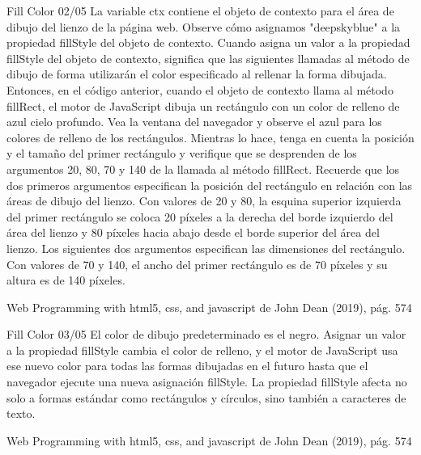 \begin{frame}{Fill Color 02/05}
\justifying
La variable ctx contiene el objeto de contexto para el área de dibujo del lienzo de la página web. Observe cómo asignamos "deepskyblue" a la propiedad fillStyle del objeto de contexto. Cuando asigna un valor a la propiedad fillStyle del objeto de contexto, significa que las siguientes llamadas al método de dibujo de forma utilizarán el color especificado al rellenar la forma dibujada. Entonces, en el código anterior, cuando el objeto de contexto llama al método fillRect, el motor de JavaScript dibuja un rectángulo con un color de relleno de azul cielo profundo. Vea la ventana del navegador y observe el azul para los colores de relleno de los rectángulos.
Mientras lo hace, tenga en cuenta la posición y el tamaño del primer rectángulo y verifique que se desprenden de los argumentos 20, 80, 70 y 140 de la llamada al método fillRect. Recuerde que los dos primeros argumentos especifican la posición del rectángulo en relación con las áreas de dibujo del lienzo. Con valores de 20 y 80, la esquina superior izquierda del primer rectángulo se coloca 20 píxeles a la derecha del borde izquierdo del área del lienzo y 80 píxeles hacia abajo desde el borde superior del área del lienzo. Los siguientes dos argumentos especifican las dimensiones del rectángulo. Con valores de 70 y 140, el ancho del primer rectángulo es de 70 píxeles y su altura es de 140 píxeles.


{\tiny Web Programming with html5, css, and javascript de John Dean (2019), pág. 574}
\end{frame}

\begin{frame}{Fill Color 03/05}
\justifying
El color de dibujo predeterminado es el negro. Asignar un valor a la propiedad fillStyle cambia el color de relleno, y el motor de JavaScript usa ese nuevo color para todas las formas dibujadas en el futuro hasta que el navegador ejecute una nueva asignación fillStyle. La propiedad fillStyle afecta no solo a formas estándar como rectángulos y círculos, sino también a caracteres de texto.

{\tiny Web Programming with html5, css, and javascript de John Dean (2019), pág. 574}
\end{frame}

